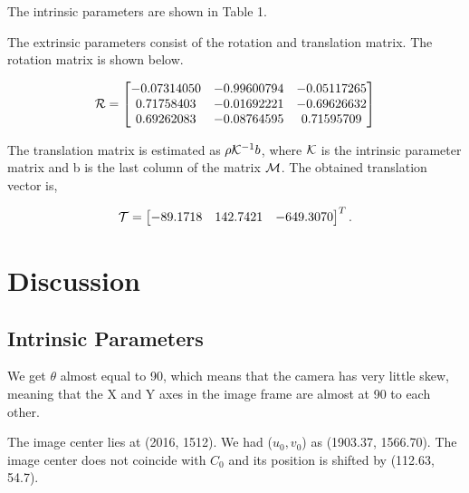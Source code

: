 \documentclass{article}
\begin{document}
The intrinsic parameters are shown in Table 1. 

The extrinsic parameters consist of the rotation and translation matrix. The rotation matrix is shown below.

\begin{equation}
\CMcal{R} = \begin{bmatrix} -0.07314050     &   -0.99600794  &     -0.05117265 \\
         0.71758403      & -0.01692221    &    -0.69626632 \\
         0.69262083   &    -0.08764595       &  0.71595709 \end{bmatrix}
\end{equation}

\medskip
The translation matrix is estimated as $\rho\CMcal{K}^{-1}b$, where $\CMcal{K}$ is the intrinsic parameter matrix and b is the last column of the matrix $\CMcal{M}$. The obtained translation vector is, 

\begin{equation}
\CMcal{T} = \begin{bmatrix} -89.1718 & 142.7421 &  -649.3070 \end{bmatrix}^T.
\end{equation}



\section{Discussion}

\subsection{Intrinsic Parameters}
We get $\theta$ almost equal to 90{\degree}, which means that the camera has very little skew, meaning that the X and Y axes in the image frame are almost at 90{\degree} to each other.

\medskip

The image center lies at (2016, 1512). We had ($u_0,v_0$) as (1903.37, 1566.70). The image center does not coincide with $C_0$ and its position is shifted by (112.63, 54.7).

\medskip
\end{document}
